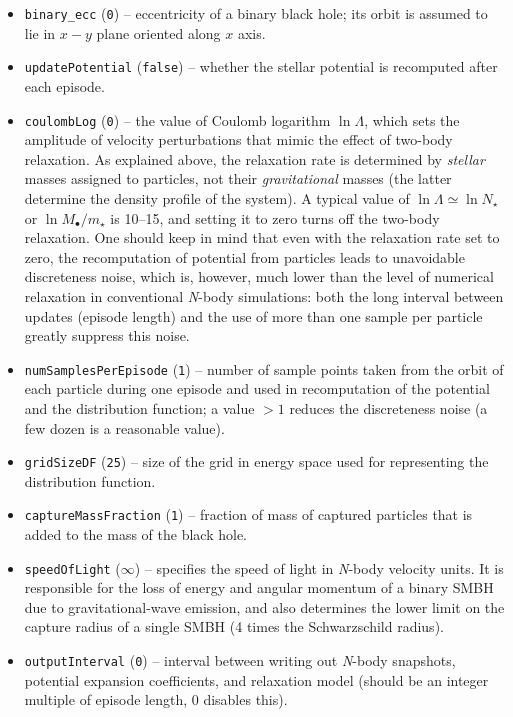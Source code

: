 \documentclass[12pt]{article}
\newcommand{\Nbody}{\textsl{N}-body\xspace}
\begin{document}
\begin{itemize}
\item \texttt{binary_ecc}  (\texttt{0}) -- eccentricity of a binary black hole; its orbit is assumed to lie in $x-y$ plane oriented along $x$ axis.
\item \texttt{updatePotential}  (\texttt{false}) -- whether the stellar potential is recomputed after each episode.
\item \texttt{coulombLog}  (\texttt{0}) -- the value of Coulomb logarithm $\ln\Lambda$, which sets the amplitude of velocity perturbations that mimic the effect of two-body relaxation. As explained above, the relaxation rate is determined by \textit{stellar} masses assigned to particles, not their \textit{gravitational} masses (the latter determine the density profile of the system). A typical value of $\ln\Lambda\simeq \ln N_\star$ or $\ln M_\bullet/m_\star$ is 10--15, and setting it to zero turns off the two-body relaxation. One should keep in mind that even with the relaxation rate set to zero, the recomputation of potential from particles leads to unavoidable discreteness noise, which is, however, much lower than the level of numerical relaxation in conventional \Nbody simulations: both the long interval between updates (episode length) and the use of more than one sample per particle greatly suppress this noise.
\item \texttt{numSamplesPerEpisode}  (\texttt{1}) -- number of sample points taken from the orbit of each particle during one episode and used in recomputation of the potential and the distribution function; a value $>1$ reduces the discreteness noise (a few dozen is a reasonable value).
\item \texttt{gridSizeDF}  (\texttt{25}) -- size of the grid in energy space used for representing the distribution function.
\item \texttt{captureMassFraction}  (\texttt{1}) -- fraction of mass of captured particles that is added to the mass of the black hole.
\item \texttt{speedOfLight}  (\texttt{$\infty$}) -- specifies the speed of light in \Nbody velocity units. It is responsible for the loss of energy and angular momentum of a binary SMBH due to gravitational-wave emission, and also determines the lower limit on the capture radius of a single SMBH (4 times the Schwarzschild radius).
\item \texttt{outputInterval}  (\texttt{0}) -- interval between writing out \Nbody snapshots, potential expansion coefficients, and relaxation model (should be an integer multiple of episode length, 0 disables this).

\end{itemize}
\end{document}
